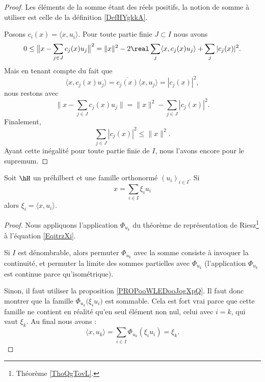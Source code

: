 \begin{proof}
    Les éléments de la somme étant des réels positifs, la notion de somme à utiliser est celle de la définition \ref{DefHYgkkA}.

    Posons \( c_i(x)=\langle x, u_i\rangle \). Pour toute partie finie \( J\subset I\) nous avons
    \begin{equation}
        0\leq \big\| x-\sum_{j\in J}c_j(x)u_j \big\|^2=\| x \|^2-2\real\sum_{j}\langle x, c_j(x)u_j\rangle +\sum_j| c_j(x) |^2.
    \end{equation}
    Mais en tenant compte du fait que 
    \begin{equation}
        \langle x, c_j(x)u_j\rangle =\overline{  c_j(x)}\langle x, u_j\rangle =| c_j(x) |^2,
    \end{equation}
    nous restons avec
    \begin{equation}    \label{EqvwXWEA}
        \| x-\sum_{j\in J}c_j(x)u_j \|=\| x \|^2-\sum_{j\in J}| c_j(x) |^2.
    \end{equation}
    Finalement,
    \begin{equation}
        \sum_{j\in J}| c_j(x) |^2\leq \| x \|^2.
    \end{equation}
    Ayant cette inégalité pour toute partie finie de \( I\), nous l'avons encore pour le supremum.
\end{proof}

\begin{proposition}     \label{PROPooWTOZooYZdlml}
    Soit \( \hH\) un préhilbert et une famille orthonormé \( (u_i)_{i\in I} \). Si 
    \begin{equation}        \label{EqitrzXi}
        x=\sum_{i\in I}\xi_iu_i
    \end{equation}
    alors \( \xi_i=\langle x, u_i\rangle \).
\end{proposition}

\begin{proof}
    Nous appliquons l'application \( \Phi_{u_k}\) du théorème de représentation de Riesz\footnote{Théorème \ref{ThoQgTovL}.} à l'équation \eqref{EqitrzXi}.

    Si \( I\) est dénombrable, alors permuter \( \Phi_{u_k}\) avec la somme consiste à invoquer la continuité, et permuter la limite des sommes partielles avec \( \Phi_{u_k}\) (l'application \( \Phi_{u_k}\) est continue parce qu'isométrique).

    Sinon, il faut utiliser la proposition \ref{PROPooWLEDooJogXpQ}. Il faut donc montrer que la famille \( \Phi_{u_k}\big( \xi_iu_i \big)\) est sommable. Cela est fort vrai parce que cette famille ne contient en réalité qu'en seul élément non nul, celui avec \( i=k\), qui vaut \( \xi_k\). Au final nous avons :
    \begin{equation}
        \langle x, u_k\rangle =\sum_{i\in I}\Phi_{u_k}(\xi_iu_i)=\xi_k.
    \end{equation}
\end{proof}

